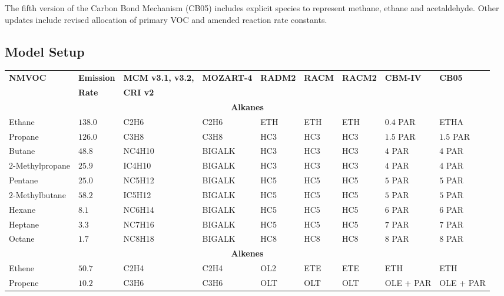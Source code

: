 The fifth version of the Carbon Bond Mechanism (CB05) \citep{Yarwood:2005} includes explicit species to represent methane, ethane and acetaldehyde. 
Other updates include revised allocation of primary VOC and amended reaction rate constants.

\subsection{Model Setup} \label{ss:model_setup}

\begin{sidewaystable}
    \centering
    \begin{tabular}{lllllllll}
        \hline \hline
        \multirow{2}{*}{\textbf{NMVOC}} & \textbf{Emission} & \textbf{MCM v3.1, v3.2,} & \multirow{2}{*}{\textbf{MOZART-4}} & \multirow{2}{*}{\textbf{RADM2}} & \multirow{2}{*}{\textbf{RACM}} & \multirow{2}{*}{\textbf{RACM2}} & \multirow{2}{*}{\textbf{CBM-IV}} & \multirow{2}{*}{\textbf{CB05}}\\ & \textbf{Rate} & \textbf{CRI v2} & & & & & & \\ 
        \hline \hline \multicolumn{9}{c}{\textbf{Alkanes}}  \\ \hline
        Ethane & $138.0$ & C2H6 & C2H6 & ETH & ETH & ETH & $0.4$ PAR & ETHA \\
        Propane  & $126.0$ & C3H8 & C3H8 & HC3 & HC3 & HC3 & $1.5$ PAR & $1.5$ PAR \\
        Butane & $48.8$ & NC4H10 & BIGALK & HC3 & HC3 & HC3 & $4$ PAR & $4$ PAR \\
        $2$-Methylpropane & $25.9$ & IC4H10 & BIGALK & HC3 & HC3 & HC3 & $4$ PAR & $4$ PAR \\
        Pentane & $25.0$ & NC5H12 & BIGALK & HC5 & HC5 & HC5 & $5$ PAR & $5$ PAR \\
        $2$-Methylbutane & $58.2$ & IC5H12 & BIGALK & HC5 & HC5 & HC5 & $5$ PAR & $5$ PAR \\
        Hexane & $8.1$ & NC6H14 & BIGALK & HC5 & HC5 & HC5 & $6$ PAR & $6$ PAR \\
        Heptane & $3.3$ & NC7H16 &  BIGALK & HC5 & HC5 & HC5 & $7$ PAR & $7$ PAR \\
        Octane & $1.7$ & NC8H18 & BIGALK & HC8 & HC8 & HC8 & $8$ PAR & $8$ PAR \\ \hline 
        \multicolumn{9}{c}{\textbf{Alkenes}} \\ \hline
        Ethene & $50.7$ & C2H4 & C2H4 & OL2 & ETE & ETE & ETH & ETH \\
        Propene & $10.2$ & C3H6 & C3H6 & OLT & OLT & OLT & OLE + PAR & OLE + PAR \\ 

\end{tabular}
\end{sidewaystable}
